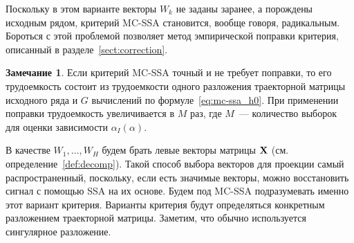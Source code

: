 \documentclass[specialist,
substylefile = spbu.rtx,
               subf,href,colorlinks=true, 12pt]{disser}
\theoremstyle{definition}
\newtheorem{remark}{Замечание}
\begin{document}
Поскольку в этом варианте векторы $W_k$ не заданы заранее, а порождены исходным рядом, критерий MC-SSA становится, вообще говоря, радикальным. Бороться с этой проблемой позволяет метод эмпирической поправки критерия, описанный в разделе~\ref{sect:correction}.
\begin{remark}\label{remark:complexity}
	Если критерий MC-SSA точный и не требует поправки, то его трудоемкость состоит из трудоемкости одного разложения траекторной матрицы исходного ряда и $G$ вычислений по формуле~\eqref{eq:mc-ssa_h0}. При применении поправки трудоемкость увеличивается в $M$ раз, где $M$~--- количество выборок для оценки зависимости $\alpha_I(\alpha)$.
\end{remark}
В качестве $W_1, \ldots,W_H$ будем брать левые векторы матрицы $\mathbf{X}$ (см. определение~\ref{def:decomp}). Такой способ выбора векторов для проекции самый распространенный, поскольку, если есть значимые векторы, можно восстановить сигнал с помощью SSA на их основе. Будем под MC-SSA подразумевать именно этот вариант критерия. Варианты критерия будут определяться конкретным разложением траекторной матрицы. Заметим, что обычно используется сингулярное разложение.
\end{document}
